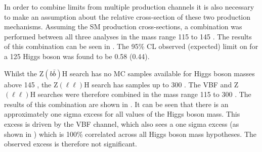In order to combine limits from multiple production channels it is also necessary to make an assumption about the relative cross-section of these two production mechanisms. Assuming the \ac{SM} production cross-sections, a combination was performed between all three analyses in the mass range 115 to 145 \GeV. The results of this combination can be seen in . The 95\% \ac{CL} observed (expected) limit on \BRinv for a 125 \GeV Higgs boson was found to be 0.58 (0.44).

Whilst the Z$(b\bar{b})$H search has no \ac{MC} samples available for Higgs boson masses above 145 \GeV, the Z$(\ell\ell)$H search has samples up to 300 \GeV. The \ac{VBF} and Z$(\ell\ell)$H searches were therefore combined in the mass range 115 to 300 \GeV. The results of this combination are shown in . It can be seen that there is an approximately one sigma excess for all values of the Higgs boson mass. This excess is driven by the \ac{VBF} channel, which also sees a one sigma excess (as shown in ) which is 100\% correlated across all Higgs boson mass hypotheses. The observed excess is therefore not significant.

